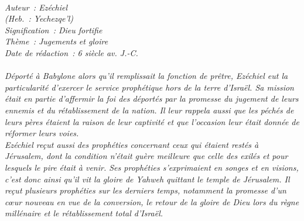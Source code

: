 \BFont
\noindent\hrulefill
{\footnotesize
\textit{
\bigskip
{\centering{}
\\Auteur~: Ezéchiel
\\(Heb.~: Yechezqe'l)
\\Signification~: Dieu fortifie
\\Thème~: Jugements et gloire
\\Date de rédaction~: 6 siècle av. J.-C.\\}
}
\textit{
\\Déporté à Babylone alors qu'il remplissait la fonction de prêtre, Ezéchiel eut la particularité d'exercer le service prophétique hors de la terre d'Israël. Sa mission était en partie d'affermir la foi des déportés par la promesse du jugement de leurs ennemis et du rétablissement de la nation. Il leur rappela aussi que les péchés de leurs pères étaient la raison de leur captivité et que l'occasion leur était donnée de réformer leurs voies.
\\Ezéchiel reçut aussi des prophéties concernant ceux qui étaient restés à Jérusalem, dont la condition n'était guère meilleure que celle des exilés et pour lesquels le pire était à venir. Ses prophéties s'exprimaient en songes et en visions, c'est donc ainsi qu'il vit la gloire de Yahweh quittant le temple de Jérusalem. Il reçut plusieurs prophéties sur les derniers temps, notamment la promesse d'un cœur nouveau en vue de la conversion, le retour de la gloire de Dieu lors du règne millénaire et le rétablissement total d'Israël.\bigskip
}
}
\par\nobreak\noindent\hrulefill

